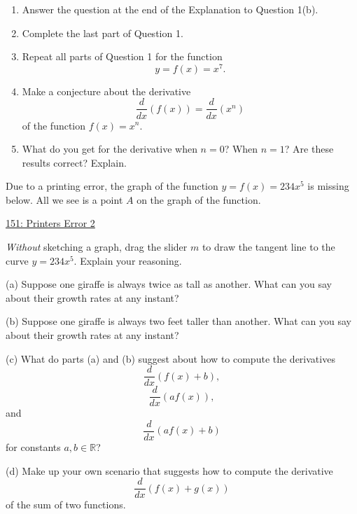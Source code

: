 \documentclass{ximera}
\begin{document}
\begin{question}  \label{Qdsferewg}
\begin{enumerate}

\item Answer the question at the end of the Explanation to Question 1(b).

\item Complete the last part of Question 1.

\item Repeat all parts of Question 1 for the function
\[
   y = f(x) = x^7.
\]

\item Make a conjecture about the derivative
\[
     \frac{d}{dx}(f(x)) =   \frac{d}{dx}\left( x^n \right)
\]
of the function $f(x)=x^n$.

\item What do you get for the derivative when $n=0$? When $n=1$? Are these results correct? Explain.

\end{enumerate}
\end{question}

\begin{question} \label{Qgkhkdsfete}
Due to a printing error, the graph of the function $y=f(x) = 234x^5$ is missing below. All we see is a point $A$ on the graph of the function. 

\begin{onlineOnly}
    \begin{center}
\end{center}
\end{onlineOnly}

\href{https://www.desmos.com/calculator/pjyqjtdcxm}{151: Printers Error 2}

\emph{Without} sketching a graph, drag the slider $m$ to draw the tangent line to the curve $y=234x^5$. Explain your reasoning.

\end{question}



\begin{question}   \label{Qergh55}
(a) Suppose one giraffe is always twice as tall as another. What can you say about their growth rates at any instant?

(b) Suppose one giraffe is always two feet taller than another. What can you say about their growth rates at any instant?

(c) What do parts (a) and (b) suggest about how to compute the derivatives
\[
   \frac{d}{dx} \left( f(x) + b  \right) ,
\]
\[
   \frac{d}{dx} \left(a f(x) \right) ,
\]
and
\[
    \frac{d}{dx} \left(a f(x) + b  \right)
\]
for constants $a,b\in \mathbb{R}$?

(d) Make up your own scenario that suggests how to compute the derivative
\[
   \frac{d}{dx} \left( f(x) + g(x)  \right) 
\]
of the sum of two functions.
\end{question}
\end{document}
